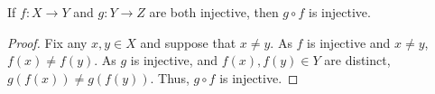 \guard




\begin{prop}
\label{prop:compositionOfInjectionIsInjection}
  If $f:X\to Y$ and $g:Y\to Z$ are both injective, then $g\circ f$ is injective.
\end{prop}
\begin{proof}
  Fix any $x,y\in X$ and suppose that $x\not=y$.
  As $f$ is injective and $x\not=y$, $f(x)\not=f(y)$.
  As $g$ is injective, and $f(x),f(y)\in Y$ are distinct, $g(f(x))\not= g(f(y))$.
  Thus, $g\circ f$ is injective.
\end{proof}
